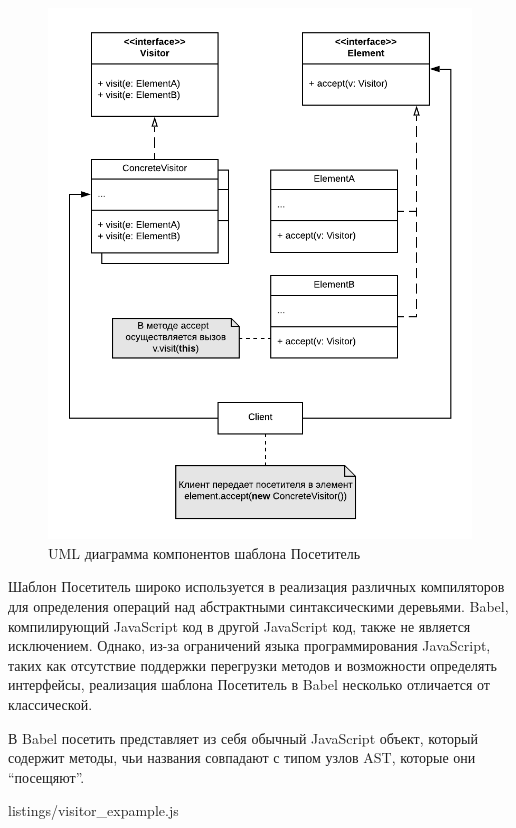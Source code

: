 \documentclass[14pt, a4paper]{article}
\begin{document}
\begin{figure}[h!]
  \centering
  \includegraphics[scale=1.0]{img/visitor_uml.png}
  \caption{UML диаграмма компонентов шаблона Посетитель}
  \label{visitor_uml}
\end{figure}

Шаблон Посетитель широко используется в реализация различных компиляторов для определения операций над
абстрактными синтаксическими деревьями. Babel, компилирующий JavaScript код в другой JavaScript код,
также не является исключением. Однако, из-за ограничений языка программирования JavaScript, таких как
отсутствие поддержки перегрузки методов и возможности определять интерфейсы, реализация шаблона Посетитель
в Babel несколько отличается от классической.

В Babel посетить представляет из себя обычный JavaScript объект, который содержит методы, чьи названия
совпадают с типом узлов AST, которые они ``посещяют''.


{listings/visitor_expample.js}
\end{document}

